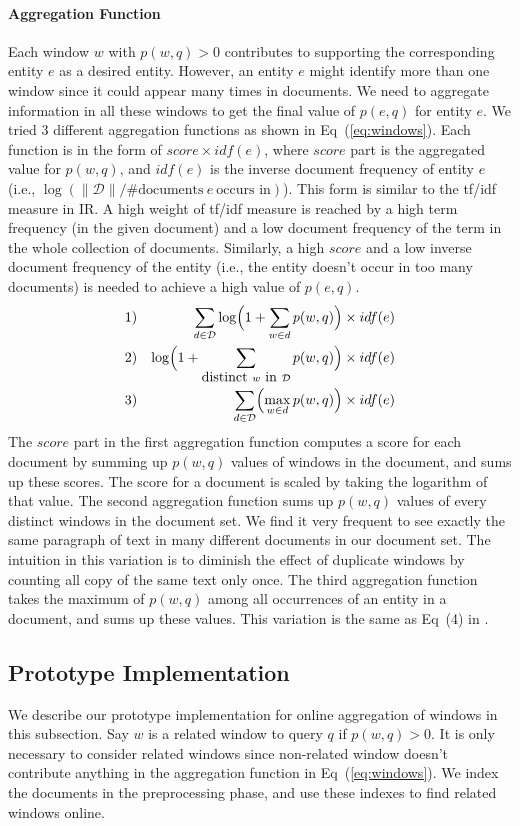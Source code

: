 \documentclass{sig-alternate}
\theoremstyle{definition}
\begin{document}
\paragraph*{Aggregation Function} Each window $w$ with $p(w, q) > 0$ contributes to supporting the corresponding entity $e$ as a desired entity. However, an entity $e$ might identify more than one window since it could appear many times in documents. We need to aggregate information in all these windows to get the final value of $p(e, q)$ for entity $e$. We tried 3 different aggregation functions as shown in Eq~(\ref{eq:windows}). Each function is in the form of $score \times idf(e)$, where $score$ part is the aggregated value for $p(w, q)$, and $idf(e)$ is the inverse document frequency of entity $e$ (i.e., $\log({\|\mathcal{D}\| / \mbox{\# documents} ~ e ~ \mbox{occurs in}})$). This form is similar to the tf/idf measure in IR. A high weight of tf/idf measure is reached by a high term frequency (in the given document) and a low document frequency of the term in the whole collection of documents. Similarly, a high $score$ and a low inverse document frequency of the entity (i.e., the entity doesn't occur in too many documents) is needed to achieve a high value of $p(e, q)$.
\begin{eqnarray}\label{eq:windows}
1) && \sum_{d \in \mathcal{D}} \log\Bigl(1 + \sum_{w \in d} p(w, q)\Bigr) \times idf(e) \nonumber \\
2) && \log\Bigl(1 + \sum_{\mbox{distinct} ~ w ~ \mbox{in} ~ \mathcal{D}} p(w, q) \Bigr) \times idf(e) \\
3) && \sum_{d \in \mathcal{D}} \Bigl(\max_{w \in d} p(w, q) \Bigr) \times idf(e) \nonumber
\end{eqnarray}
The $score$ part in the first aggregation function computes a score for each document by summing up $p(w, q)$ values of windows in the document, and sums up these scores. The score for a document is scaled by taking the logarithm of that value. The second aggregation function sums up $p(w, q)$ values of every distinct windows in the document set. We find it very frequent to see exactly the same paragraph of text in many different documents in our document set. The intuition in this variation is to diminish the effect of duplicate windows by counting all copy of the same text only once. The third aggregation function takes the maximum of $p(w, q)$ among all occurrences of an entity in a document, and sums up these values. This variation is the same as Eq~(4) in \cite{cheng2007entityrank}.

\subsection{Prototype Implementation}\label{sec:aggregationimp}
We describe our prototype implementation for online aggregation of windows in this subsection. Say $w$ is a related window to query $q$ if $p(w, q) > 0$. It is only necessary to consider related windows since non-related window doesn't contribute anything in the aggregation function in Eq~(\ref{eq:windows}). We index the documents in the preprocessing phase, and use these indexes to find related windows online.
\end{document}
